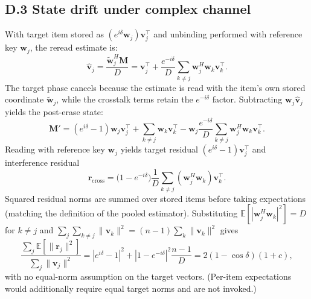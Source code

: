 \documentclass[11pt,a4paper]{article}
\newcommand{\M}{\mathbf{M}}
\begin{document}
\subsection{D.3 State drift under complex channel}
With target item stored as $(e^{i\delta}\mathbf{w}_j)\mathbf{v}_j^\top$ and unbinding performed with reference key $\mathbf{w}_j$, the reread estimate is:
\begin{equation}
\hat{\mathbf{v}}_j = \frac{\tilde{\mathbf{w}}_j^H \M}{D} = \mathbf{v}_j^\top + \frac{e^{-i\delta}}{D}\sum_{k \ne j} \mathbf{w}_j^H \mathbf{w}_k \mathbf{v}_k^\top .
\end{equation}
The target phase cancels because the estimate is read with the item's own stored coordinate $\tilde{\mathbf{w}}_j$, while the crosstalk terms retain the $e^{-i\delta}$ factor.
Subtracting $\mathbf{w}_j \hat{\mathbf{v}}_j$ yields the post-erase state:
\begin{equation}
\M' = (e^{i\delta}-1)\mathbf{w}_j \mathbf{v}_j^\top + \sum_{k \ne j} \mathbf{w}_k \mathbf{v}_k^\top - \mathbf{w}_j \frac{e^{-i\delta}}{D}\sum_{k \ne j} \mathbf{w}_j^H \mathbf{w}_k \mathbf{v}_k^\top .
\end{equation}
Reading with reference key $\mathbf{w}_j$ yields target residual $(e^{i\delta}-1)\mathbf{v}_j^\top$ and interference residual
\begin{equation}
\mathbf{r}_{\text{cross}} = \bigl(1-e^{-i\delta}\bigr)\frac{1}{D}\sum_{k \ne j}(\mathbf{w}_j^H \mathbf{w}_k)\mathbf{v}_k^\top .
\end{equation}
Squared residual norms are summed over stored items before taking expectations (matching the definition of the pooled estimator). Substituting $\mathbb{E}[|\mathbf{w}_j^H \mathbf{w}_k|^2] = D$ for $k \ne j$ and $\sum_j \sum_{k \ne j} \|\mathbf{v}_k\|^2 = (n-1)\sum_k \|\mathbf{v}_k\|^2$ gives
\begin{equation}
\frac{\sum_j \mathbb{E}[\|\mathbf{r}_j\|^2]}{\sum_j \|\mathbf{v}_j\|^2} = |e^{i\delta}-1|^2 + |1-e^{-i\delta}|^2 \frac{n-1}{D} = 2(1-\cos\delta)(1+c),
\end{equation}
with no equal-norm assumption on the target vectors. (Per-item expectations would additionally require equal target norms and are not invoked.)
\end{document}
